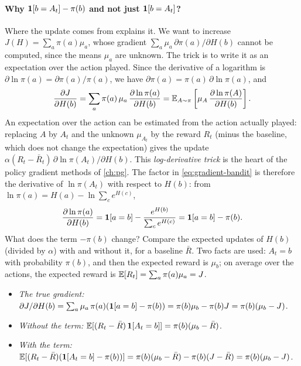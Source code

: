 \paragraph{Why $\mathbf{1}[b = A_t] - \pi(b)$ and not just $\mathbf{1}[b = A_t]$?}
Where the update comes from explains it. We want to increase $J(H) =
\sum_a \pi(a) \mu_a$, whose gradient $\sum_a \mu_a\, \partial \pi(a) /
\partial H(b)$ cannot be computed, since the means $\mu_a$ are unknown. The
trick is to write it as an expectation over the action played. Since the
derivative of a logarithm is $\partial \ln \pi(a) = \partial \pi(a) /
\pi(a)$, we have $\partial \pi(a) = \pi(a)\, \partial \ln \pi(a)$, and
\begin{equation*}
  \frac{\partial J}{\partial H(b)} = \sum_a \pi(a)\, \mu_a\, \frac{\partial
  \ln \pi(a)}{\partial H(b)} = \mathbb{E}_{A \sim \pi}\left[ \mu_A\, \frac{\partial
  \ln \pi(A)}{\partial H(b)} \right].
\end{equation*}
An expectation over the action can be estimated from the action actually
played: replacing $A$ by $A_t$ and the unknown $\mu_{A_t}$ by the reward
$R_t$ (minus the baseline, which does not change the expectation) gives
the update $\alpha (R_t - \bar R_t)\, \partial \ln \pi(A_t) / \partial H(b)$.
This \emph{log-derivative trick} is the heart of the policy gradient
methods of \cref{ch:pg}. The factor in \eqref{eq:gradient-bandit} is
therefore the derivative of $\ln \pi(A_t)$ with respect to $H(b)$: from
$\ln \pi(a) = H(a) - \ln \sum_c e^{H(c)}$,
\begin{equation*}
  \frac{\partial \ln \pi(a)}{\partial H(b)} = \mathbf{1}[a = b] -
  \frac{e^{H(b)}}{\sum_c e^{H(c)}} = \mathbf{1}[a = b] - \pi(b).
\end{equation*}
What does the term $-\pi(b)$ change? Compare the expected updates of
$H(b)$ (divided by $\alpha$) with and without it, for a baseline $\bar R$.
Two facts are used: $A_t = b$ with probability $\pi(b)$, and then the
expected reward is $\mu_b$; on average over the actions, the expected
reward is $\mathbb{E}[R_t] = \sum_a \pi(a) \mu_a = J$.
\begin{itemize}[nosep]
  \item \emph{The true gradient:} $\partial J / \partial H(b) = \sum_a
    \mu_a\, \pi(a) (\mathbf{1}[a = b] - \pi(b)) = \pi(b) \mu_b - \pi(b) J =
    \pi(b) (\mu_b - J)$.
  \item \emph{Without the term:} $\mathbb{E}[(R_t - \bar R)\, \mathbf{1}[A_t = b]] =
    \pi(b) (\mu_b - \bar R)$.
  \item \emph{With the term:} $\mathbb{E}[(R_t - \bar R)(\mathbf{1}[A_t = b] - \pi(b))]
    = \pi(b) (\mu_b - \bar R) - \pi(b) (J - \bar R) = \pi(b) (\mu_b -
    J)$.
\end{itemize}
